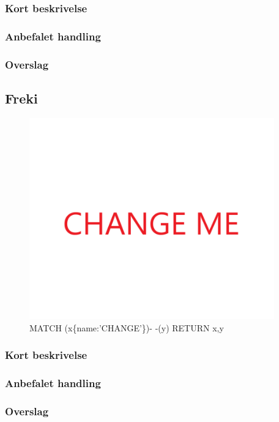 \documentclass{article}
\begin{document}
\subsubsection{Kort beskrivelse}
\subsubsection{Anbefalet handling}
\subsubsection{Overslag}


\subsection{Freki}
\begin{figure}[h]
\includegraphics[width=300pt]{CHANGE.PNG}
\caption{MATCH (x\{name:'CHANGE'\})- -(y) RETURN x,y}
\end{figure}
\subsubsection{Kort beskrivelse}
\subsubsection{Anbefalet handling}
\subsubsection{Overslag}
\end{document}
